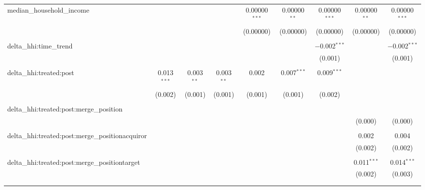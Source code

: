 \begin{table}[H]
{\begin{tabular}{@{\extracolsep{5pt}}lcccccccc}
  median\_household\_income &  &  &  & 0.00000$^{***}$ & 0.00000$^{**}$ & 0.00000$^{***}$ & 0.00000$^{**}$ & 0.00000$^{***}$ \\  

   &  &  &  & (0.00000) & (0.00000) & (0.00000) & (0.00000) & (0.00000) \\  

   & & & & & & & & \\  

  delta\_hhi:time\_trend &  &  &  &  &  & $-$0.002$^{***}$ &  & $-$0.002$^{***}$ \\  

   &  &  &  &  &  & (0.001) &  & (0.001) \\  

   & & & & & & & & \\  

  delta\_hhi:treated:post & 0.013$^{***}$ & 0.003$^{**}$ & 0.003$^{**}$ & 0.002 & 0.007$^{***}$ & 0.009$^{***}$ &  &  \\  

   & (0.002) & (0.001) & (0.001) & (0.001) & (0.001) & (0.002) &  &  \\  

   & & & & & & & & \\  

  delta\_hhi:treated:post:merge\_position &  &  &  &  &  &  &  &  \\  

   &  &  &  &  &  &  & (0.000) & (0.000) \\  

   & & & & & & & & \\  

  delta\_hhi:treated:post:merge\_positionacquiror &  &  &  &  &  &  & 0.002 & 0.004 \\  

   &  &  &  &  &  &  & (0.002) & (0.002) \\  

   & & & & & & & & \\  

  delta\_hhi:treated:post:merge\_positiontarget &  &  &  &  &  &  & 0.011$^{***}$ & 0.014$^{***}$ \\  

   &  &  &  &  &  &  & (0.002) & (0.003) \\  

   & & & & & & & & \\  

 \hline \\[-1.8ex]  


\end{tabular}}
\end{table}
